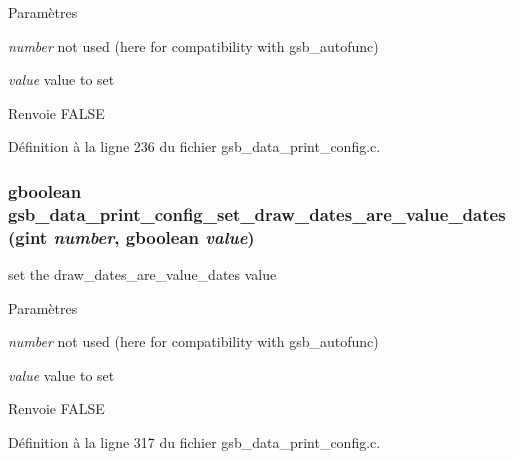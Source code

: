 \begin{DoxyParams}{Paramètres}
\item[{\em number}]not used (here for compatibility with gsb\_\-autofunc) \item[{\em value}]value to set\end{DoxyParams}
\begin{DoxyReturn}{Renvoie}
FALSE 
\end{DoxyReturn}


Définition à la ligne 236 du fichier gsb\_\-data\_\-print\_\-config.c.

\subsubsection[{gsb\_\-data\_\-print\_\-config\_\-set\_\-draw\_\-dates\_\-are\_\-value\_\-dates}]{\setlength{\rightskip}{0pt plus 5cm}gboolean gsb\_\-data\_\-print\_\-config\_\-set\_\-draw\_\-dates\_\-are\_\-value\_\-dates (gint {\em number}, \/  gboolean {\em value})}\label{gsb__data__print__config_8h_aaa7ae93d7b50c959a8844a2e6773c7e4}
set the draw\_\-dates\_\-are\_\-value\_\-dates value


\begin{DoxyParams}{Paramètres}
\item[{\em number}]not used (here for compatibility with gsb\_\-autofunc) \item[{\em value}]value to set\end{DoxyParams}
\begin{DoxyReturn}{Renvoie}
FALSE 
\end{DoxyReturn}


Définition à la ligne 317 du fichier gsb\_\-data\_\-print\_\-config.c.

